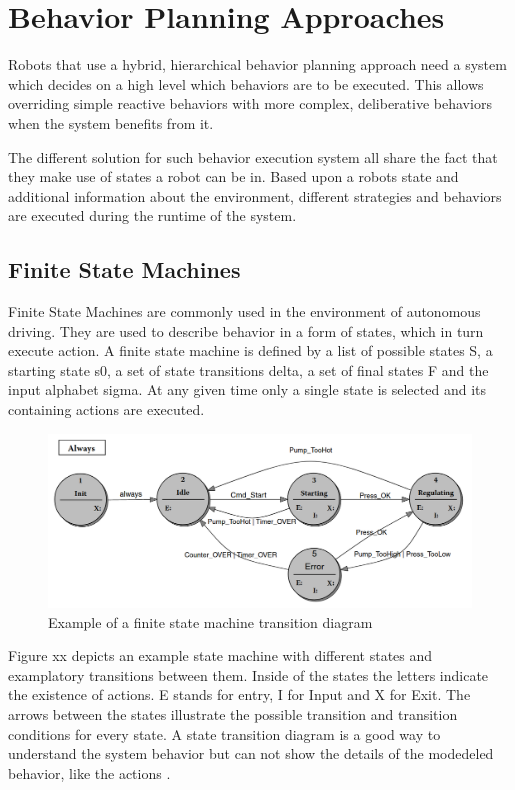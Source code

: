 \section{Behavior Planning Approaches}

Robots that use a hybrid, hierarchical behavior planning approach need a system which decides on a high level which behaviors are to be executed. This allows overriding simple reactive behaviors with more complex, deliberative behaviors when the system benefits from it. 

The different solution for such behavior execution system all share the fact that they make use of states a robot can be in. Based upon a robots state and additional information about the environment, different strategies and behaviors are executed during the runtime of the system. 
 

\subsection{Finite State Machines}

Finite State Machines are commonly used in the environment of autonomous driving. They are used to describe behavior in a form of states, which in turn execute action. A finite state machine is defined by a list of possible states S, a starting state s0, a set of state transitions delta, a set of final states F and the input alphabet sigma. At any given time only a single state is selected and its containing actions are executed. \\

\begin{figure}
	\includegraphics[width=1.0\textwidth]{images/fsm.png} 
	\caption{Example of a finite state machine transition diagram \cite{wagner2006} }
\end{figure}

Figure xx depicts an example state machine with different states and examplatory transitions between them. Inside of the states the letters indicate the existence of actions.  E stands for entry, I for Input and X for Exit. The arrows between the states illustrate the possible transition and transition conditions for every state. A state transition diagram is a good way to understand the system behavior but can not show the details of the modedeled behavior, like the actions \cite{wagner2006}. \\

